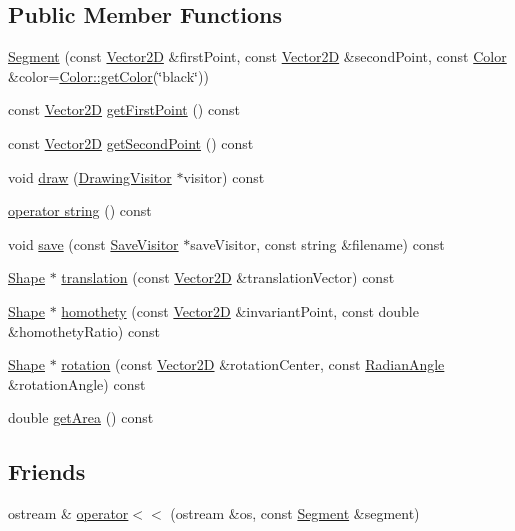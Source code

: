 \subsection*{Public Member Functions}
\begin{DoxyCompactItemize}
\item 
\hyperlink{class_segment_a1ac49abbcc008ed6cb519c87a421375e}{Segment} (const \hyperlink{class_vector2_d}{Vector2D} \&first\+Point, const \hyperlink{class_vector2_d}{Vector2D} \&second\+Point, const \hyperlink{class_color}{Color} \&color=\hyperlink{class_color_a94697e8c9eb81124c5a7c1439e1e7348}{Color\+::get\+Color}(\char`\"{}black\char`\"{}))
\item 
const \hyperlink{class_vector2_d}{Vector2D} \hyperlink{class_segment_a6aaa2508c09b60520c402f6e1054be5c}{get\+First\+Point} () const
\item 
const \hyperlink{class_vector2_d}{Vector2D} \hyperlink{class_segment_a7d7d1e5fa25f759f6bf0912925c9e922}{get\+Second\+Point} () const
\item 
void \hyperlink{class_segment_ad7b3641fc3670b1fba9cd97c2c40e3ba}{draw} (\hyperlink{class_drawing_visitor}{Drawing\+Visitor} $\ast$visitor) const
\item 
\hyperlink{class_segment_a28b3be893a35a0d73574354752c147fd}{operator string} () const
\item 
void \hyperlink{class_segment_a76c475fb193a0d7bb987da60dfc88ccd}{save} (const \hyperlink{class_save_visitor}{Save\+Visitor} $\ast$save\+Visitor, const string \&filename) const
\item 
\hyperlink{class_shape}{Shape} $\ast$ \hyperlink{class_segment_a8592ee9b864b2ebc61ab1810fa7dc577}{translation} (const \hyperlink{class_vector2_d}{Vector2D} \&translation\+Vector) const
\item 
\hyperlink{class_shape}{Shape} $\ast$ \hyperlink{class_segment_a5fe8d9711a0d3405a8c4cf3270069ee3}{homothety} (const \hyperlink{class_vector2_d}{Vector2D} \&invariant\+Point, const double \&homothety\+Ratio) const
\item 
\hyperlink{class_shape}{Shape} $\ast$ \hyperlink{class_segment_a46c1007c530f9be37ee7637e4ffdbf57}{rotation} (const \hyperlink{class_vector2_d}{Vector2D} \&rotation\+Center, const \hyperlink{class_radian_angle}{Radian\+Angle} \&rotation\+Angle) const
\item 
double \hyperlink{class_segment_af019f332cb32a21a1f9b7ae5acd7b4e7}{get\+Area} () const
\end{DoxyCompactItemize}
\subsection*{Friends}
\begin{DoxyCompactItemize}
\item 
ostream \& \hyperlink{class_segment_a8071236184a6b1617c06f5e5742f25a7}{operator$<$$<$} (ostream \&os, const \hyperlink{class_segment}{Segment} \&segment)
\end{DoxyCompactItemize}

